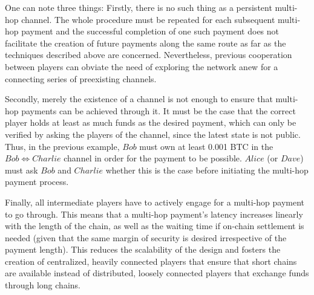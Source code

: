 \begin{itemize}
    One can note three things: Firstly, there is no such thing as a persistent multi-hop
    channel. The whole procedure must be repeated for each subsequent multi-hop payment
    and the successful completion of one such payment does not facilitate the creation of
    future payments along the same route as far as the techniques described above are
    concerned. Nevertheless, previous cooperation between players can obviate the need of
    exploring the network anew for a connecting series of preexisting channels.

    Secondly, merely the existence of a channel is not enough to ensure that multi-hop
    payments can be achieved through it. It must be the case that the correct player holds
    at least as much funds as the desired payment, which can only be verified by asking
    the players of the channel, since the latest state is not public. Thus, in the
    previous example, $Bob$ must own at least 0.001 BTC in the $Bob \Leftrightarrow
    Charlie$ channel in order for the payment to be possible. $Alice$ (or $Dave$) must ask
    $Bob$ and $Charlie$ whether this is the case before initiating the multi-hop payment
    process.

    Finally, all intermediate players have to actively engage for a multi-hop payment to
    go through. This means that a multi-hop payment's latency increases linearly with the
    length of the chain, as well as the waiting time if on-chain settlement is needed
    (given that the same margin of security is desired irrespective of the payment
    length). This reduces the scalability of the design and fosters the creation of
    centralized, heavily connected players that ensure that short chains are available
    instead of distributed, loosely connected players that exchange funds through long
    chains.
  \end{itemize}

